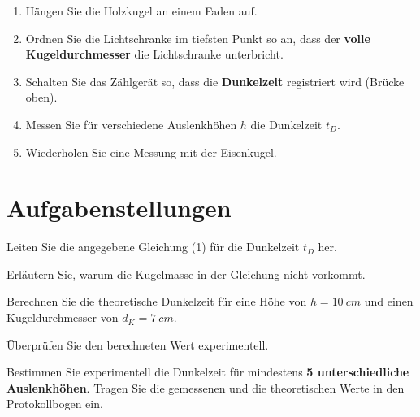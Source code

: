 \documentclass[11pt,a4paper]{scrartcl}
\begin{document}
	\begin{hilfebox}[title={\faIcon{lightbulb} Durchführung}]
		\begin{enumerate}
			\item Hängen Sie die Holzkugel an einem Faden auf.
			\item Ordnen Sie die Lichtschranke im tiefsten Punkt so an, dass der \textbf{volle Kugeldurchmesser} die Lichtschranke unterbricht.
			\item Schalten Sie das Zählgerät so, dass die \textbf{Dunkelzeit} registriert wird (Brücke oben).
			\item Messen Sie für verschiedene Auslenkhöhen $h$ die Dunkelzeit $t_D$.
			\item Wiederholen Sie eine Messung mit der Eisenkugel.
		\end{enumerate}
	\end{hilfebox}
	
	\section*{Aufgabenstellungen}
	
	\begin{aufgabe}[title={\faIcon{pencil-alt} Aufgabe 1: Herleitung}]
		Leiten Sie die angegebene Gleichung (1) für die Dunkelzeit $t_D$ her.
	\end{aufgabe}
	
	\begin{aufgabe}[title={\faIcon{pencil-alt} Aufgabe 2: Interpretation}]
		Erläutern Sie, warum die Kugelmasse in der Gleichung nicht vorkommt.
	\end{aufgabe}
	
	\begin{aufgabe}[title={\faIcon{pencil-alt} Aufgabe 3: Beispielrechnung}]
		Berechnen Sie die theoretische Dunkelzeit für eine Höhe von $h = \SI{10}{cm}$ und einen Kugeldurchmesser von $d_K = \SI{7}{cm}$.
	\end{aufgabe}
	
	\begin{aufgabe}[title={\faIcon{pencil-alt} Aufgabe 4: Experimentelle Überprüfung}]
		Überprüfen Sie den berechneten Wert experimentell.
	\end{aufgabe}
	
	\begin{aufgabe}[title={\faIcon{pencil-alt} Aufgabe 5: Messreihe}]
		Bestimmen Sie experimentell die Dunkelzeit für mindestens \textbf{5 unterschiedliche Auslenkhöhen}. Tragen Sie die gemessenen und die theoretischen Werte in den Protokollbogen ein.
	\end{aufgabe}
	
\end{document}
